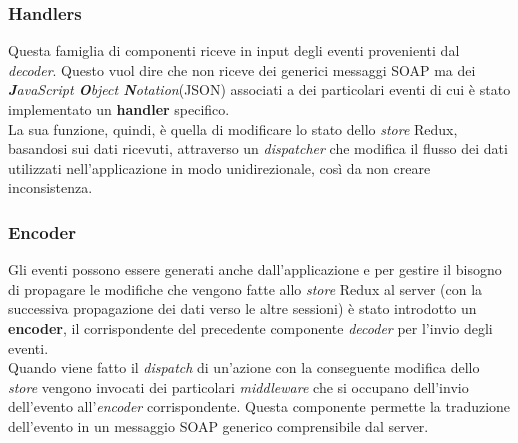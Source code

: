 \subsubsection{Handlers}
Questa famiglia di componenti riceve in input degli eventi provenienti dal \emph{decoder}. Questo vuol dire che non riceve dei generici messaggi SOAP ma dei \emph{\textbf{J}avaScript \textbf{O}bject \textbf{N}otation}(\acrshort{JSON}) associati a dei particolari eventi di cui è stato implementato un \textbf{handler} specifico.\\
La sua funzione, quindi, è quella di modificare lo stato dello \emph{store} Redux, basandosi sui dati ricevuti, attraverso un \emph{dispatcher} che modifica il flusso dei dati utilizzati nell'applicazione in modo unidirezionale, così da non creare inconsistenza.
\subsubsection{Encoder}
Gli eventi possono essere generati anche dall'applicazione e per gestire il bisogno di propagare le modifiche che vengono fatte allo \emph{store} Redux al server (con la successiva propagazione dei dati verso le altre sessioni) è stato introdotto un \textbf{encoder}, il corrispondente del precedente componente \emph{decoder} per l'invio degli eventi. \\
Quando viene fatto il \emph{dispatch} di un'azione con la conseguente modifica dello \emph{store} vengono invocati dei particolari \emph{middleware} che si occupano dell'invio dell'evento all'\emph{encoder} corrispondente. Questa componente permette la traduzione dell'evento in un messaggio SOAP generico comprensibile dal server.

